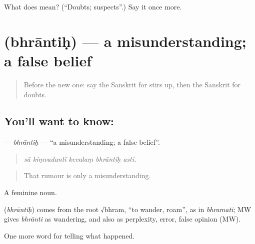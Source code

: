 \begin{tcolorbox}[breakable,colback=teal!4,colframe=teal!35!black,title={Before you move on}]
What does  mean? (\textquotedblleft{}Doubts; suspects\textquotedblright{}.) Say it once more.
\end{tcolorbox}
\section[\texorpdfstring{\sk{भ्रान्तिः} (bhrāntiḥ)}{भ्रान्तिः (bhrāntiḥ)}]{ (bhrāntiḥ) — a misunderstanding; a false belief}

\label{lesson:SA-C311-bhrantih}



\begin{quote}
Before the new one: say the Sanskrit for stirs up, then the Sanskrit for doubts.
\end{quote}

\subsection*{You'll want to know: }
\textbf{} — \emph{bhrāntiḥ} — \textquotedblleft{}a misunderstanding; a false belief\textquotedblright{}.

\begin{quote}
    
\end{quote}

\begin{quote}
\emph{sā kiṃvadantī kevalaṃ bhrāntiḥ asti.}
\end{quote}

\begin{quote}
That rumour is only a misunderstanding.
\end{quote}

A feminine noun.

\begin{cousinweb}
\textbf{} (\emph{bhrāntiḥ}) comes from the root √bhram, \textquotedblleft{}to wander, roam\textquotedblright{}, as in \emph{bhramati}; MW gives \emph{bhrānti} as wandering, and also as perplexity, error, false opinion (MW).
\end{cousinweb}

\begin{grammarlens}[title={What you've built}]
One more word for telling what happened.
\end{grammarlens}

